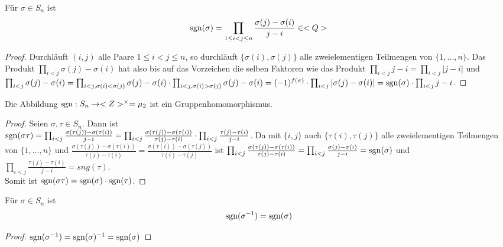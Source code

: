\begin{lemma}
	Für $\sigma\in S_n$ ist
	\begin{align}
		\operatorname{sgn}(\sigma)=\prod_{1\le i<j\le n} \frac{\sigma(j)-\sigma(i)}{j-i}\in <Q>\notag
	\end{align}
\end{lemma}
\begin{proof}
	Durchläuft $(i,j)$ alle Paare $1\le i<j\le n$, so durchläuft $\{\sigma(i),\sigma(j)\}$ alle zweielementigen Teilmengen von $\{1,...,
	n\}$. Das Produkt $\prod_{i<j} \sigma(j)-\sigma(i)$ hat also bis auf das Vorzeichen die selben Faktoren wie das Produkt 
	$\prod_{i<j} j-i=\prod_{i<j} |j-i|$ und $\prod_{i<j} \sigma(j)-\sigma(i)=\prod_{i<j,\sigma(i)<\sigma(j)} 
	\sigma(j)-\sigma(i) \cdot \prod_{i<j,\sigma(i)>\sigma(j)} \sigma(j)-\sigma(i)=(-1)^{f(\sigma)}\cdot \prod_{i<j} 
	|\sigma(j)-\sigma(i)|=\operatorname{sgn}(\sigma)\cdot \prod_{i<j} j-i$.
\end{proof}

\begin{proposition}
	Die Abbildung $\operatorname{sgn}: S_n \to <Z>^{\times}=\mu_2$ ist ein Gruppenhomomorphismus.
\end{proposition}
\begin{proof}
	Seien $\sigma,\tau\in S_n$. Dann ist\\
	$\operatorname{sgn}(\sigma\tau)=\prod_{i<j} \frac{\sigma(\tau(j))-\sigma(\tau(i))}{j-i}=\prod_{i<j} \frac{\sigma(\tau(j))-\sigma(
		\tau(i))}{\tau(j)-\tau(i)}\cdot \prod_{i<j} \frac{\tau(j)-\tau(i)}{j-i}$. Da mit $\{i,j\}$ auch $\{\tau(i),\tau(j)\}$ alle 
	zweielementigen Teilmengen von $\{1,...,n\}$ und $\frac{\sigma(\tau(j))-\sigma(\tau(i))}{\tau(j)-\tau(i)}=\frac{\sigma(\tau(i))-
		\sigma(\tau(j))}{\tau(i)-\tau(j)}$ ist $\prod_{i<j} \frac{\sigma(\tau(j))-\sigma(\tau(i))}{\tau(j)-\tau(i)}=\prod_
	{i<j} \frac{\sigma(j)-\sigma(i)}{j-i}=\operatorname{sgn}(\sigma)$ und $\prod_{i<j} \frac{\tau(j)-\tau(i)}{j-i}=sng(\tau)$. \\
	Somit ist $\operatorname{sgn}(\sigma\tau)=\operatorname{sgn}(\sigma)\cdot \operatorname{sgn}(\tau)$.
\end{proof}

\begin{conclusion}
	Für $\sigma\in S_n$ ist 
	\begin{align}
		\operatorname{sgn}(\sigma^{-1})=\operatorname{sgn}(\sigma)\notag
	\end{align}
\end{conclusion}
\begin{proof}
	$\operatorname{sgn}(\sigma^{-1})=\operatorname{sgn}(\sigma)^{-1}=\operatorname{sgn}(\sigma)$
\end{proof}

